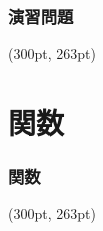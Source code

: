 \documentclass[dvipdfmx]{beamer}
\begin{document}
\begin{frame}[t, fragile, label=42]
    \frametitle{演習問題}
    \begin{textblock*}{0.3\linewidth}(300pt, 263pt)
    \hyperlink{41}{}
    \space
    \hyperlink{43}{}
    \end{textblock*}
\end{frame}

\section{関数}
\begin{frame}[label=43]
    \frametitle{関数}
    \tableofcontents[sections={2, 8}]
    \begin{textblock*}{0.3\linewidth}(300pt, 263pt)
    \hyperlink{42}{}
    \space
    \hyperlink{44}{}
    \end{textblock*}
\end{frame}
\end{document}

